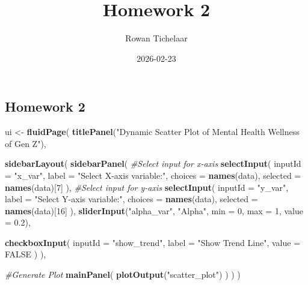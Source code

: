 \documentclass[
]{article}
\title{Homework 2}
\author{Rowan Tichelaar}
\date{2026-02-23}
\newenvironment{Shaded}{\begin{snugshade}}{\end{snugshade}}
\newcommand{\AttributeTok}[1]{\textcolor[rgb]{0.13,0.29,0.53}{#1}}
\newcommand{\CommentTok}[1]{\textcolor[rgb]{0.56,0.35,0.01}{\textit{#1}}}
\newcommand{\ConstantTok}[1]{\textcolor[rgb]{0.56,0.35,0.01}{#1}}
\newcommand{\DecValTok}[1]{\textcolor[rgb]{0.00,0.00,0.81}{#1}}
\newcommand{\FloatTok}[1]{\textcolor[rgb]{0.00,0.00,0.81}{#1}}
\newcommand{\FunctionTok}[1]{\textcolor[rgb]{0.13,0.29,0.53}{\textbf{#1}}}
\newcommand{\NormalTok}[1]{#1}
\newcommand{\OtherTok}[1]{\textcolor[rgb]{0.56,0.35,0.01}{#1}}
\newcommand{\StringTok}[1]{\textcolor[rgb]{0.31,0.60,0.02}{#1}}
\begin{document}
\maketitle

\subsection{Homework 2}\label{homework-2}

\begin{Shaded}
\begin{Highlighting}[]
\NormalTok{ui }\OtherTok{\textless{}{-}} \FunctionTok{fluidPage}\NormalTok{(}
  \FunctionTok{titlePanel}\NormalTok{(}\StringTok{"Dynamic Scatter Plot of Mental Health Wellness of Gen Z"}\NormalTok{),}
  
  \FunctionTok{sidebarLayout}\NormalTok{(}
    \FunctionTok{sidebarPanel}\NormalTok{(}
      \CommentTok{\#Select input for x{-}axis}
      \FunctionTok{selectInput}\NormalTok{(}
        \AttributeTok{inputId =} \StringTok{"x\_var"}\NormalTok{,}
        \AttributeTok{label =} \StringTok{"Select X{-}axis variable:"}\NormalTok{,}
        \AttributeTok{choices =} \FunctionTok{names}\NormalTok{(data),}
        \AttributeTok{selected =} \FunctionTok{names}\NormalTok{(data)[}\DecValTok{7}\NormalTok{]}
\NormalTok{      ),}
      \CommentTok{\#Select input for y{-}axis}
      \FunctionTok{selectInput}\NormalTok{(}
        \AttributeTok{inputId =} \StringTok{"y\_var"}\NormalTok{,}
        \AttributeTok{label =} \StringTok{"Select Y{-}axis variable:"}\NormalTok{,}
        \AttributeTok{choices =} \FunctionTok{names}\NormalTok{(data),}
        \AttributeTok{selected =} \FunctionTok{names}\NormalTok{(data)[}\DecValTok{16}\NormalTok{]}
\NormalTok{      ),}
      \FunctionTok{sliderInput}\NormalTok{(}\StringTok{"alpha\_var"}\NormalTok{, }\StringTok{"Alpha"}\NormalTok{, }\AttributeTok{min =} \DecValTok{0}\NormalTok{, }\AttributeTok{max =} \DecValTok{1}\NormalTok{, }\AttributeTok{value =} \FloatTok{0.2}\NormalTok{),}
      
      \FunctionTok{checkboxInput}\NormalTok{(}
        \AttributeTok{inputId =} \StringTok{"show\_trend"}\NormalTok{, }
        \AttributeTok{label =} \StringTok{"Show Trend Line"}\NormalTok{, }
        \AttributeTok{value =} \ConstantTok{FALSE}
\NormalTok{      )}
\NormalTok{    ),}

    \CommentTok{\#Generate Plot}
    \FunctionTok{mainPanel}\NormalTok{(}
      \FunctionTok{plotOutput}\NormalTok{(}\StringTok{"scatter\_plot"}\NormalTok{)}
\NormalTok{    )}
\NormalTok{  )}
\NormalTok{)}


\end{Highlighting}
\end{Shaded}
\end{document}
